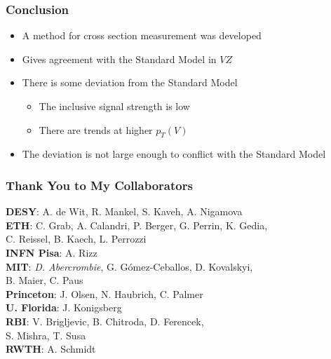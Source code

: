 \documentclass{beamer}
\newcommand{\beginbackup}{
  \newcounter{framenumbervorappendix}
  \setcounter{framenumbervorappendix}{\value{framenumber}}
}
\newcommand{\backupend}{
  \addtocounter{framenumbervorappendix}{-\value{framenumber}}
  \addtocounter{framenumber}{\value{framenumbervorappendix}}
}
\begin{document}
\begin{frame}
  \frametitle{Conclusion}

  \begin{itemize}
  \item A method for cross section measurement was developed
  \item Gives agreement with the Standard Model in $V\!Z$
  \item There is some deviation from the Standard Model
    \begin{itemize}
    \item The inclusive signal strength is low
    \item There are trends at higher $p_T(V)$
    \end{itemize}
  \item The deviation is not large enough to conflict with the Standard Model
  \end{itemize}

\end{frame}

\begin{frame}
  \frametitle{Thank You to My Collaborators}

  {\bf DESY}: A. de Wit, R. Mankel, S. Kaveh, A. Nigamova \\
  \vfill
  {\bf ETH}: C. Grab, A. Calandri, P. Berger, G. Perrin, K. Gedia, \\
  \qquad \quad C. Reissel, B. Kaech, L. Perrozzi \\
  \vfill
  {\bf INFN Pisa}: A. Rizz \\
  \vfill
  {\bf MIT}: \emph{D. Abercrombie}, G. G\'omez-Ceballos, D. Kovalskyi, \\
  \qquad \quad B. Maier, C. Paus \\
  \vfill
  {\bf Princeton}: J. Olsen, N. Haubrich, C. Palmer \\
  \vfill
  {\bf U. Florida}: J. Konigsberg \\
  \vfill
  {\bf RBI}: V. Brigljevic, B. Chitroda, D. Ferencek, \\
  \qquad \quad S. Mishra, T. Susa \\
  \vfill
  {\bf RWTH}: A. Schmidt \\

\end{frame}

\end{document}
